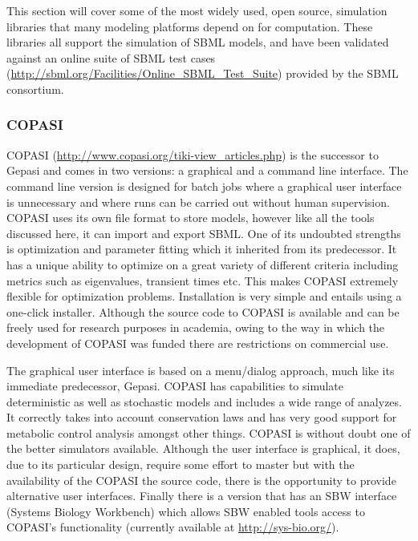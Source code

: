 This section will cover some of the most widely used, open source,
simulation libraries that many modeling platforms depend on for
computation. These libraries all support the simulation of SBML models,
and have been validated against an online suite of SBML test cases
(\url{http://sbml.org/Facilities/Online_SBML_Test_Suite}) provided by
the SBML consortium.

\subsubsection{COPASI}

COPASI \autocite{hoops2006copasi}
(\url{http://www.copasi.org/tiki-view_articles.php}) is the successor to
Gepasi and comes in two versions: a graphical and a command line
interface. The command line version is designed for batch jobs where a
graphical user interface is unnecessary and where runs can be carried
out without human supervision. COPASI uses its own file format to store
models, however like all the tools discussed here, it can import and
export SBML. One of its undoubted strengths is optimization and
parameter fitting which it inherited from its predecessor. It has a
unique ability to optimize on a great variety of different criteria
including metrics such as eigenvalues, transient times etc. This makes
COPASI extremely flexible for optimization problems. Installation is
very simple and entails using a one-click installer. Although the source
code to COPASI is available and can be freely used for research purposes
in academia, owing to the way in which the development of COPASI was
funded there are restrictions on commercial use.

The graphical user interface is based on a menu/dialog approach, much
like its immediate predecessor, Gepasi. COPASI has capabilities to
simulate deterministic as well as stochastic models and includes a wide
range of analyzes. It correctly takes into account conservation laws and
has very good support for metabolic control analysis amongst other
things. COPASI is without doubt one of the better simulators available.
Although the user interface is graphical, it does, due to its particular
design, require some effort to master but with the availability of the
COPASI the source code, there is the opportunity to provide alternative
user interfaces. Finally there is a version that has an SBW interface
(Systems Biology Workbench) which allows SBW enabled tools access to
COPASI's functionality (currently available at
\url{http://sys-bio.org/}).

